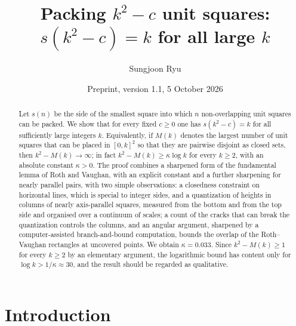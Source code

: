\documentclass[11pt]{amsart}
\title[Unbounded deficiency for unit squares at integer side]{Packing $k^2-c$ unit squares: \\ $s(k^2-c)=k$ for all large $k$}
\author{Sungjoon Ryu}
\date{Preprint, version 1.1, 5 October 2026}
\theoremstyle{definition}
\theoremstyle{remark}
\begin{document}
\begin{abstract}
Let $s(n)$ be the side of the smallest square into which $n$ non-overlapping unit squares can be packed.
We show that for every fixed $c\ge 0$ one has $s(k^2-c)=k$ for all sufficiently large integers $k$.
Equivalently, if $M(k)$ denotes the largest number of unit squares that can be placed in $[0,k]^2$ so that they are
pairwise disjoint as closed sets, then $k^2-M(k)\to\infty$; in fact $k^2-M(k)\ge \kappa\log k$ for every $k\ge2$,
with an absolute constant $\kappa>0$.
The proof combines a sharpened form of the fundamental lemma of Roth and Vaughan, with an explicit constant and a
further sharpening for nearly parallel pairs, with two simple observations: a closedness constraint on horizontal
lines, which is special to integer sides, and a quantization of heights in columns of nearly axis-parallel squares,
measured from the bottom and from the top side and organised over a continuum of scales; a count of the cracks that can
break the quantization controls the columns, and an angular argument, sharpened by a computer-assisted branch-and-bound
computation, bounds the overlap of the Roth--Vaughan rectangles at uncovered points. We obtain $\kappa=0.033$. Since $k^2-M(k)\ge1$ for every $k\ge2$ by an
elementary argument, the logarithmic bound has content only for $\log k>1/\kappa\approx30$, and the result should be
regarded as qualitative.
\end{abstract}

\maketitle

\section{Introduction}
\end{document}
